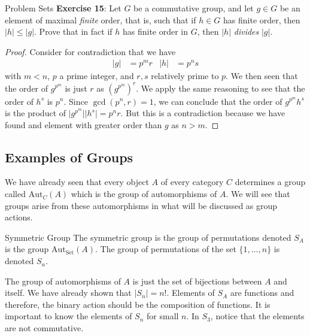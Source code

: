 \documentclass{report}
\begin{document}
\begin{exercises}{Problem Sets}
    \textbf{Exercise 15}: Let $G$ be a commutative group, and let $g \in G$ be an element of maximal \textit{finite} order, that is, such that if $h \in G$ has finite order, then $\lvert h \rvert \leq \lvert g \rvert$. Prove that in fact if $h$ has finite order in $G$, then $\lvert h \rvert$ \textit{divides} $\lvert g \rvert$.
    \begin{proof}
        Consider for contradiction that we have 
            \begin{align*}
                \lvert g \rvert &= p^{m}r & \lvert h \rvert &= p^{n}s   
            \end{align*}
        with $m < n$, $p$ a prime integer, and $r, s$ relatively prime to $p$. We then seen that the order of $g^{p^{m}}$ is just $r$ as $(g^{p^{m}})^{r}$. We apply the same reasoning to see that the order of $h^{s}$ is $p^{n}$. Since $\gcd(p^{n}, r) = 1$, we can conclude that the order of $g^{p^{m}}h^{s}$ is the product of $\lvert g^{p^{m}} \rvert\lvert h^{s} \rvert = p^{n}r$. But this is a contradiction because we have found and element with greater order than $g$ as $n > m$.
    \end{proof}
\end{exercises}

\begin{topic}
    \section{Examples of Groups}
\end{topic}

We have already seen that every object $A$ of every category $C$ determines a group called $\text{Aut}_{C}(A)$ which is the group of automorphisms of $A$. We will see that groups arise from these automorphisms in what will be discussed as group actions.

\begin{definition}[\label{def:2.2.1}]{Symmetric Group}
    The symmetric group is the group of permutations denoted $S_{A}$ is the group $\text{Aut}_{\text{Set}}(A)$. The group of permutations of the set $\{1, \ldots, n\}$ is denoted $S_{n}$.
\end{definition}

The group of automorphisms of $A$ is just the set of bijections between $A$ and itself. We have already shown that $\lvert S_{n} \rvert = n!$. Elements of $S_{A}$ are functions and therefore, the binary action should be the composition of functions. It is important to know the elements of $S_{n}$ for small $n$. In $S_{3}$, notice that the elements are not commutative. 
\end{document}
